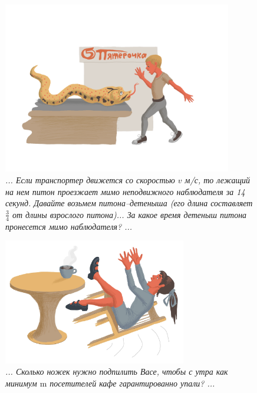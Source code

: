 \documentclass[10pt]{scrbook} \usepackage{modules/nonstahp_book}
\begin{document}
\begin{figure} \begin{center}
	\includegraphics[width=10cm]{figures/color/04}
	\caption{
             {\itshape ... Если транспортер движется со скоростью $v$ м/с, то лежащий 
             на нем питон проезжает мимо неподвижного наблюдателя за 14 секунд. 
             Давайте возьмем питона–детеныша (его длина составляет $\tfrac{3}{4}$ от 
             длины взрослого питона)... %
             За какое время детеныш питона пронесется мимо наблюдателя? ...}\\
             }
\end{center} \end{figure}

\begin{figure} \begin{center}
	\includegraphics[width=8cm]{figures/color/05c}
	\caption{
             {\itshape ... Сколько ножек нужно подпилить Васе, 
              чтобы с утра как минимум $\mathrm{m}$ посетителей кафе гарантированно упали? ...}\\
             }
\end{center} \end{figure}
\end{document}
